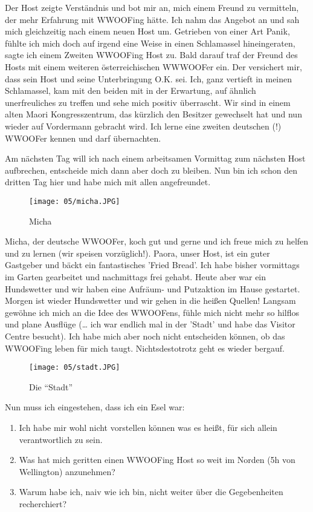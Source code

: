 Der Host zeigte Verständnis und bot mir an, mich einem Freund zu
vermitteln, der mehr Erfahrung mit WWOOFing hätte. Ich nahm das
Angebot an und sah mich gleichzeitig nach einem neuen Host
um. Getrieben von einer Art Panik, fühlte ich mich doch auf irgend
eine Weise in einen Schlamassel hineingeraten, sagte ich einem Zweiten
WWOOFing Host zu. Bald darauf traf der Freund des Hosts mit einem
weiteren österreichischen WWWOOFer ein. Der versichert mir, dass sein
Host und seine Unterbringung O.K. sei. Ich, ganz vertieft in meinen
Schlamassel, kam mit den beiden mit in der Erwartung, auf ähnlich
unerfreuliches zu treffen und sehe mich positiv überrascht. Wir sind
in einem alten Maori Kongresszentrum, das kürzlich den Besitzer
gewechselt hat und nun wieder auf Vordermann gebracht wird. Ich lerne
eine zweiten deutschen (!) WWOOFer kennen und darf übernachten.

Am nächsten Tag will ich nach einem arbeitsamen Vormittag zum nächsten
Host aufbrechen, entscheide mich dann aber doch zu bleiben. Nun bin
ich schon den dritten Tag hier und habe mich mit allen
angefreundet.

\begin{wrapfigure}{r}{0.3\textwidth}
  \centering
  \texttt{[image: 05/micha.JPG]}
  \caption*{Micha}
\end{wrapfigure}
Micha, der deutsche WWOOFer, koch gut und gerne und ich
freue mich zu helfen und zu lernen (wir speisen vorzüglich!). Paora,
unser Host, ist ein guter Gastgeber und bäckt ein fantastisches 'Fried
Bread'. Ich habe bisher vormittags im Garten gearbeitet und
nachmittags frei gehabt. Heute aber war ein Hundswetter und wir haben
eine Aufräum- und Putzaktion im Hause gestartet. Morgen ist wieder
Hundswetter und wir gehen in die heißen Quellen! Langsam gewöhne ich
mich an die Idee des WWOOFens, fühle mich nicht mehr so hilflos und
plane Ausflüge (\ldots{} ich war endlich mal in der 'Stadt' und habe
das Visitor Centre besucht). Ich habe mich aber noch nicht entscheiden
können, ob das WWOOFing leben für mich taugt.  Nichtsdestotrotz geht
es wieder bergauf.
\begin{figure}[h]
  \centering
  \texttt{[image: 05/stadt.JPG]}
  \caption*{Die ``Stadt''}
\end{figure}

Nun muss ich eingestehen, dass ich ein Esel war:

\begin{enumerate}
\tightlist
\item
  Ich habe mir wohl nicht vorstellen können was es heißt, für sich
  allein verantwortlich zu sein.
\item
  Was hat mich geritten einen WWOOFing Host so weit im Norden (5h von
  Wellington) anzunehmen?
\item
  Warum habe ich, naiv wie ich bin, nicht weiter über die Gegebenheiten
  recherchiert?
\end{enumerate}

